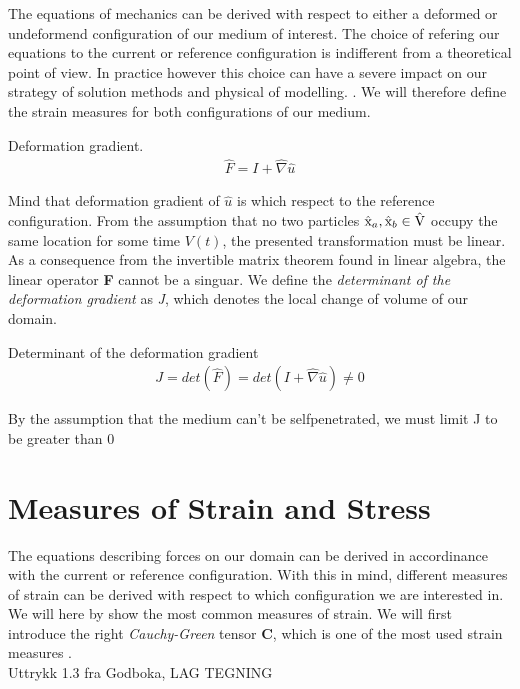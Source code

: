 The equations of mechanics can be derived with respect to either a deformed or undeformend configuration of our medium of interest. The choice of refering our equations to the current or reference configuration is indifferent from a theoretical point of view. In practice however this choice can have a severe impact on our strategy of solution methods and physical of modelling.   \cite{Wriggers2006}. We will therefore define the strain measures for both configurations of our medium.  

\begin{defn}
Deformation gradient. 
\begin{align}
\hat{F} = I + \hat{\nabla} \hat{u} 
\end{align} 
\end{defn}

Mind that deformation gradient of $\hat{u}$ is which respect to the reference configuration. 
From the assumption that no two particles $\text{\^{x}}_a, \text{\^{x}}_b \in \text{\^{V}}$ occupy the same location for some time $V(t)$, the presented transformation must be linear. As a consequence from the invertible matrix theorem found in linear algebra, the linear operator \textbf{F} cannot be a singuar.  
We define the  \textit{determinant of the deformation gradient} as \textit{J}, which denotes the local change of volume of our domain. 

\begin{defn}
Determinant of the deformation gradient
\begin{align}
J = det(\hat{F}) = det( I + \hat{\nabla} \hat{u} ) \neq 0
\end{align} 
\end{defn}


By the assumption that the medium can't be selfpenetrated, we must limit  J to be greater than 0 \cite{Wriggers2006}

\section{Measures of Strain and Stress}
The equations describing forces on our domain can be derived in accordinance with the current or reference configuration. With this in mind, different measures of strain can be derived with respect to which configuration we are interested in. We will here by \cite{Richter2016} show the most common measures of strain. We will first introduce the right \textit{Cauchy-Green} tensor \textbf{C}, which is one of the most used strain measures \cite{Wriggers2006}. \\ Uttrykk 1.3 fra Godboka, LAG TEGNING \\ 


